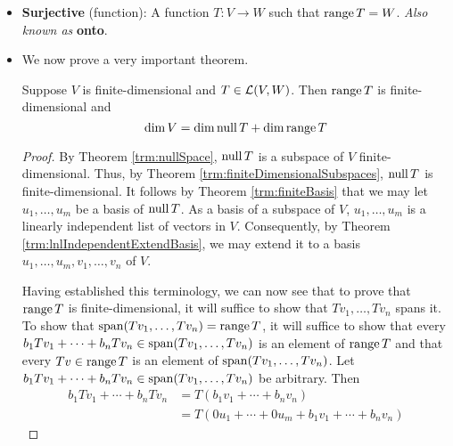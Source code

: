 \documentclass[../main.tex]{subfiles}
\begin{document}
\begin{itemize}
\begin{theorem}
\begin{proof}
            Let $w\in\range T$ and $\lambda\in\F$ be arbitrary. Then there exists $v\in V$ such that $Tv=w$. It follows by homogeneity that
            \begin{equation*}
                T(\lambda v) = \lambda Tv = \lambda w
            \end{equation*}
            Therefore, since $\lambda v\in V$, we have that $\lambda w\in\range T$, as desired.
        \end{proof}
    \end{theorem}
    \item \textbf{Surjective} (function): A function $T:V\to W$ such that $\operatorname{range} T=W$. \emph{Also known as} \textbf{onto}.
    \item We now prove a very important theorem.
    \begin{theorem}\label{trm:fundamentalTheoremLinearMaps}
        Suppose $V$ is finite-dimensional and $T\in\mathcal{L}(V,W)$. Then $\operatorname{range} T$ is finite-dimensional and
        \begin{equation*}
            \dim V = \dim\operatorname{null} T+\dim\operatorname{range} T
        \end{equation*}
        \begin{proof}
            By Theorem \ref{trm:nullSpace}, $\operatorname{null} T$ is a subspace of $V$ finite-dimensional. Thus, by Theorem \ref{trm:finiteDimensionalSubspaces}, $\operatorname{null} T$ is finite-dimensional. It follows by Theorem \ref{trm:finiteBasis} that we may let $u_1,\dots,u_m$ be a basis of $\operatorname{null} T$. As a basis of a subspace of $V$, $u_1,\dots,u_m$ is a linearly independent list of vectors in $V$. Consequently, by Theorem \ref{trm:lnlIndependentExtendBasis}, we may extend it to a basis $u_1,\dots,u_m,v_1,\dots,v_n$ of $V$.\par
            Having established this terminology, we can now see that to prove that $\operatorname{range} T$ is finite-dimensional, it will suffice to show that $Tv_1,\dots,Tv_n$ spans it. To show that $\operatorname{span}(Tv_1,\dots,Tv_n)=\operatorname{range} T$, it will suffice to show that every $b_1Tv_1+\cdots+b_nTv_n\in\operatorname{span}(Tv_1,\dots,Tv_n)$ is an element of $\operatorname{range} T$ and that every $Tv\in\operatorname{range} T$ is an element of $\operatorname{span}(Tv_1,\dots,Tv_n)$. Let $b_1Tv_1+\cdots+b_nTv_n\in\operatorname{span}(Tv_1,\dots,Tv_n)$ be arbitrary. Then
            \begin{align*}
                b_1Tv_1+\cdots+b_nTv_n &= T(b_1v_1+\cdots+b_nv_n)\\
                &= T(0u_1+\cdots+0u_m+b_1v_1+\cdots+b_nv_n)
            \end{align*}

\end{proof}
\end{theorem}
\end{itemize}
\end{document}
